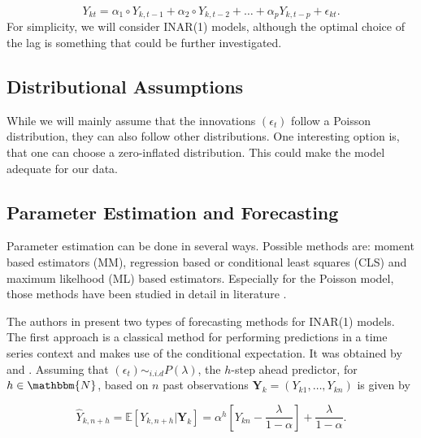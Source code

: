 \begin{equation}
Y_{kt} = \alpha_1 \circ Y_{k,t-1} + \alpha_2 \circ Y_{k,t-2} + \ldots + \alpha_p Y_{k,t-p} +\epsilon_{kt}.
\label{eq:Inar(p) model ts}
\end{equation}
%
For simplicity, we will consider INAR(1) models, although the optimal choice of the lag is something that could be further investigated. 

\subsection{Distributional Assumptions}
\label{sec: Inar Distributional assumptions}

While we will mainly assume that the innovations $(\epsilon_t)$ follow a Poisson distribution, they can also follow other distributions. One interesting option is, that one can choose a zero-inflated distribution. This could make the model adequate for our data. 


\subsection{Parameter Estimation and Forecasting}
\label{sec: Inar Parameter Estimation and Forecasting}

Parameter estimation can be done in several ways. Possible methods are: moment based estimators (MM), regression based or conditional least squares (CLS) and maximum likelhood (ML) based estimators. Especially for the Poisson model, those methods have been studied in detail in literature \textcite{Silva:2005}. 

The authors in \textcite{Silva:2005} present two types of forecasting methods for INAR(1) models. The first approach is a classical method for performing predictions in a time series context and makes use of the conditional expectation. It was obtained by \textcite{Bre:1993} and \textcite{Freeland:2004}. Assuming that $(\epsilon_t) \sim_{i.i.d} P(\lambda)$, the $h$-step ahead predictor, for $h\in \mathbbm{N}$, based on $n$ past observations $\bm{Y}_k=(Y_{k1},\ldots,Y_{kn})$ is given by

\begin{equation}
\hat{Y}_{k,n+h} = \mathbb{E}[Y_{k,n+h} | \bm{Y}_k] = \alpha^h \left[Y_{kn}- \frac{\lambda}{1-\alpha} \right] + \frac{\lambda}{1-\alpha}.
\label{eq:Forecasting Classic}
\end{equation}


